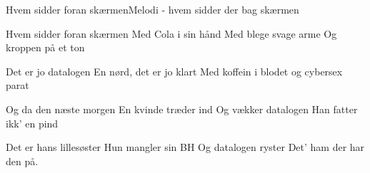 \begin{sang}{Hvem sidder foran skærmen}{Melodi - hvem sidder der bag skærmen}
\begin{vers}
Hvem sidder foran skærmen
Med Cola i sin hånd
Med blege svage arme
Og kroppen på et ton
\end{vers}
\begin{vers}
Det er jo datalogen
En nørd, det er jo klart
Med koffein i blodet
og cybersex parat
\end{vers}
\begin{vers}
Og da den næste morgen
En kvinde træder ind 
Og vækker datalogen
Han fatter ikk' en pind
\end{vers}
\begin{vers}
Det er hans lillesøster
Hun mangler sin BH
Og datalogen ryster
Det' ham der har den på.
\end{vers}
\end{sang}
